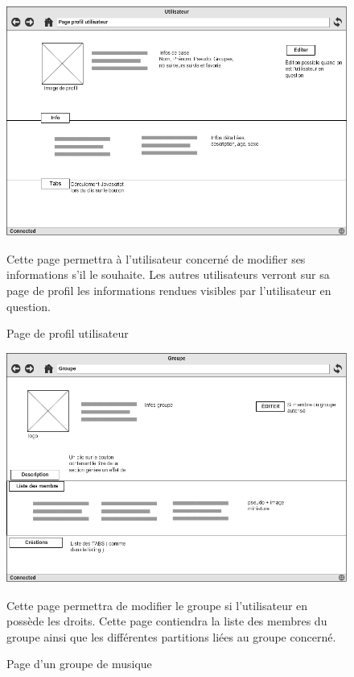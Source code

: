 \begin{figure}[H]

\centering
\includegraphics[scale=0.5]{User}
\caption{Page de profil utilisateur}

Cette page permettra à l'utilisateur concerné de modifier ses informations s'il le souhaite.
\newline Les autres utilisateurs verront sur sa page de profil les informations rendues visibles par l'utilisateur en question.
\end{figure}

\begin{figure}[H]

\centering
\includegraphics[scale=0.5]{Group}
\caption{Page d'un groupe de musique}

Cette page permettra de modifier le groupe si l'utilisateur en possède les droits.
\newline Cette page contiendra la liste des membres du groupe ainsi que les différentes partitions liées au groupe concerné.
\end{figure}

